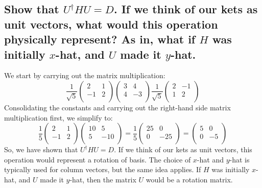 \documentclass{article}
\begin{document}
\subsection{Show that \( U^\dagger HU = D \). If we think of our kets as unit vectors, what would this operation physically represent? As in, what if \( H \) was initially \( x \)-hat, and \( U \) made it \( y \)-hat.}
We start by carrying out the matrix multiplication:
\begin{equation}
\frac{1}{\sqrt{5}}
    \begin{pmatrix}
        2 & 1 \\
        -1 & 2 \\
    \end{pmatrix}
    \begin{pmatrix}
        3 & 4 \\
        4 & -3 \\
    \end{pmatrix}
    \frac{1}{\sqrt{5}}
    \begin{pmatrix}
        2 & -1 \\
        1 & 2 \\
    \end{pmatrix}
\end{equation}
Consolidating the constants and carrying out the right-hand side matrix multiplication first, we simplify to:
\begin{equation}
    \frac{1}{5}
    \begin{pmatrix}
        2 & 1 \\
        -1 & 2 \\
    \end{pmatrix}
    \begin{pmatrix}
        10 & 5 \\
        5 & -10 \\
    \end{pmatrix}
=
    \frac{1}{5}
    \begin{pmatrix}
        25 & 0 \\
        0 & -25 \\
    \end{pmatrix}
=
    \begin{pmatrix}
        5 & 0 \\
        0 & -5 \\
    \end{pmatrix}
\end{equation}
So, we have shown that \( U^\dagger HU = D \). If we think of our kets as unit vectors, this operation would represent a rotation of basis. The choice of \(x\)-hat and \(y\)-hat is typically used for column vectors, but the same idea applies. If \( H \) was initially \( x \)-hat, and \( U \) made it \( y \)-hat, then the matrix \( U \) would be a rotation matrix.
\end{document}

